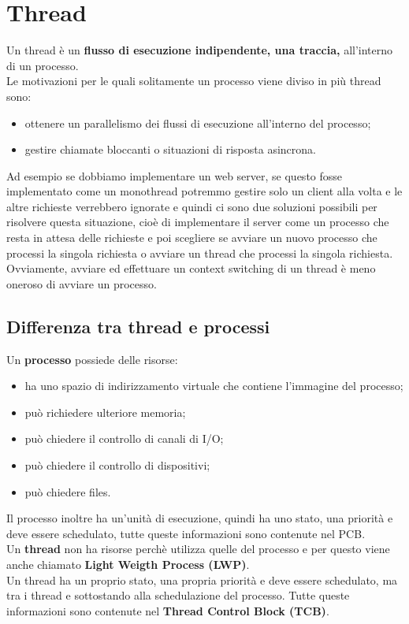 \documentclass[12pt, letterpaper]{report}
\begin{document}
 	\chapter{Thread}
	Un thread è un \textbf{flusso di esecuzione indipendente, una traccia,} all'interno di un processo. \\
	Le motivazioni per le quali solitamente un processo viene diviso in più thread sono:
	\begin{itemize}
		\item ottenere un parallelismo dei flussi di esecuzione all'interno del processo;
		\item gestire chiamate bloccanti o situazioni di risposta asincrona.
	\end{itemize}
	Ad esempio se dobbiamo implementare un web server, se questo fosse implementato come un monothread potremmo gestire solo un client alla volta e le altre richieste verrebbero ignorate e quindi ci sono due soluzioni possibili per risolvere questa situazione, cioè di implementare il server come un processo che resta in attesa delle richieste e poi scegliere se avviare un nuovo processo che processi la singola richiesta o avviare un thread che processi la singola richiesta. \\
	Ovviamente, avviare ed effettuare un context switching di un thread è meno oneroso di avviare un processo.
	\section{Differenza tra thread e processi}
	Un \textbf{processo} possiede delle risorse:
	\begin{itemize}
		\item ha uno spazio di indirizzamento virtuale che contiene l'immagine del processo;
		\item può richiedere ulteriore memoria;
		\item può chiedere il controllo di canali di I/O;
		\item può chiedere il controllo di dispositivi;
		\item può chiedere files.
	\end{itemize}
	Il processo inoltre ha un'unità di esecuzione, quindi ha uno stato, una priorità e deve essere schedulato, tutte queste informazioni sono contenute nel PCB. \\
	Un \textbf{thread} non ha risorse perchè utilizza quelle del processo e per questo viene anche chiamato \textbf{Light Weigth Process (LWP)}. \\
	Un thread ha un proprio stato, una propria priorità e deve essere schedulato, ma tra i thread e sottostando alla schedulazione del processo. Tutte queste informazioni sono contenute nel \textbf{Thread Control Block (TCB)}.
\end{document}
